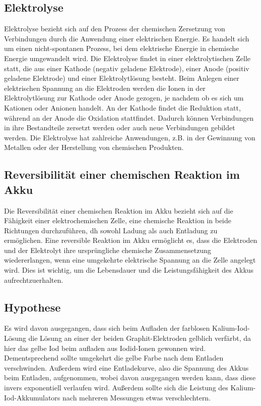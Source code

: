 \documentclass[11pt]{article}
\begin{document}
\subsection{Elektrolyse}
Elektrolyse bezieht sich auf den Prozess der chemischen Zersetzung von Verbindungen durch die Anwendung einer elektrischen Energie. Es handelt sich um einen nicht-spontanen Prozess, bei dem elektrische Energie in chemische Energie umgewandelt wird. Die Elektrolyse findet in einer elektrolytischen Zelle statt, die aus einer Kathode (negativ geladene Elektrode), einer Anode (positiv geladene Elektrode) und einer Elektrolytlösung besteht. Beim Anlegen einer elektrischen Spannung an die Elektroden werden die Ionen in der Elektrolytlösung zur Kathode oder Anode gezogen, je nachdem ob es sich um Kationen oder Anionen handelt. An der Kathode findet die Reduktion statt, während an der Anode die Oxidation stattfindet. Dadurch können Verbindungen in ihre Bestandteile zersetzt werden oder auch neue Verbindungen gebildet werden. Die Elektrolyse hat zahlreiche Anwendungen, z.B. in der Gewinnung von Metallen oder der Herstellung von chemischen Produkten.

\subsection{Reversibilität einer chemischen Reaktion im Akku}
Die Reversibilität einer chemischen Reaktion im Akku bezieht sich auf die Fähigkeit einer elektrochemischen Zelle, eine chemische Reaktion in beide Richtungen durchzuführen, dh sowohl Ladung als auch Entladung zu ermöglichen. Eine reversible Reaktion im Akku ermöglicht es, dass die Elektroden und der Elektrolyt ihre ursprüngliche chemische Zusammensetzung wiedererlangen, wenn eine umgekehrte elektrische Spannung an die Zelle angelegt wird. Dies ist wichtig, um die Lebensdauer und die Leistungsfähigkeit des Akkus aufrechtzuerhalten.

\subsection{Hypothese}
Es wird davon ausgegangen, dass sich beim Aufladen der farblosen Kalium-Iod-Lösung die Lösung an einer der beiden Graphit-Elektroden gelblich verfärbt, da hier das gelbe Iod beim aufladen aus Iodid-Ionen gewonnen wird. Dementsprechend sollte umgekehrt die gelbe Farbe nach dem Entladen verschwinden. Außerdem wird eine Entladekurve, also die Spannung des Akkus beim Entladen, aufgenommen, wobei davon ausgegangen werden kann, dass diese invers exponentiell verlaufen wird. Außerdem sollte sich die Leistung des Kalium-Iod-Akkumulators nach mehreren Messungen etwas verschlechtern. 
\end{document}
